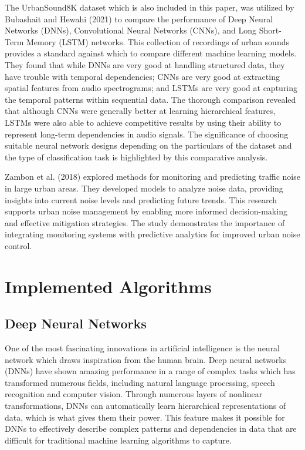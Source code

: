 \documentclass[conference]{IEEEtran}
\begin{document}
The UrbanSound8K dataset which is also included in this paper, was utilized by Bubashait and Hewahi (2021) to compare the performance of Deep Neural Networks (DNNs), Convolutional Neural Networks (CNNs), and Long Short-Term Memory (LSTM) networks. This collection of recordings of urban sounds provides a standard against which to compare different machine learning models.\cite{gupta2019dealing} They found that while DNNs are very good at handling structured data, they have trouble with temporal dependencies; CNNs are very good at extracting spatial features from audio spectrograms; and LSTMs are very good at capturing the temporal patterns within sequential data. The thorough comparison revealed that although CNNs were generally better at learning hierarchical features, LSTMs were also able to achieve competitive results by using their ability to represent long-term dependencies in audio signals. The significance of choosing suitable neural network designs depending on the particulars of the dataset and the type of classification task is highlighted by this comparative analysis.\cite{bubashait2021urban}



Zambon et al. (2018) explored methods for monitoring and predicting traffic noise in large urban areas.\cite{app8020251} They developed models to analyze noise data, providing insights into current noise levels and predicting future trends. This research supports urban noise management by enabling more informed decision-making and effective mitigation strategies. The study demonstrates the importance of integrating monitoring systems with predictive analytics for improved urban noise control. \cite{50article}



\section{Implemented Algorithms}
\subsection{Deep Neural Networks}
One of the most fascinating innovations in artificial intelligence is the neural network which draws inspiration from the human brain. \cite{128859190} Deep neural networks (DNNs) have shown amazing performance in a range of complex tasks which has transformed numerous fields, including natural language processing, speech recognition and computer vision. Through numerous layers of nonlinear transformations, DNNs can automatically learn hierarchical representations of data, which is what gives them their power. This feature makes it possible for DNNs to effectively describe complex patterns and dependencies in data that are difficult for traditional machine learning algorithms to capture.\cite{samek2021explaining}
\end{document}
